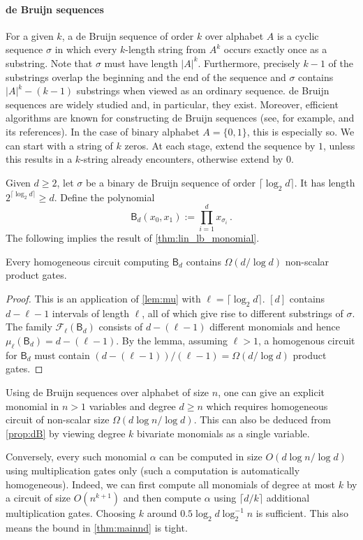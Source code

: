 \documentclass[11pt]{article}
\renewcommand{\fam}{\textbf{$\mathcal{F}$}}
\newcommand{\dB}{\mathsf{B}}
\begin{document}
\paragraph{de Bruijn sequences}
  For a given $k$, a de Bruijn sequence of order $k$ over alphabet $A$ is a cyclic sequence $\sigma$ in which every $k$-length string from $A^k$ occurs exactly once as a substring.  
  Note that $\sigma$ must have length $|A|^k$.
  Furthermore, precisely  $k-1$ of the substrings  overlap the beginning and the end of the sequence and $\sigma$ contains $|A|^k -(k-1)$ substrings when viewed as an ordinary sequence. 
  de Bruijn sequences  are widely studied and, in particular, they exist.
  Moreover, efficient algorithms are known for constructing de Bruijn sequences (see, for example, \cite{Sww16} and its references).  
  In the case of binary alphabet $A=\{0,1\}$, this is especially so.
  We can start with a string of $k$ zeros. At each stage, extend the sequence by $1$, unless this results in a $k$-string already encounters, otherwise extend by $0$.    

  Given $d\geq 2$, let $\sigma$ be a binary de Bruijn sequence of order $\lceil \log_2 d\rceil $. 
  It has length $2^{\lceil \log_2 d\rceil} \geq d$. Define the polynomial 
  \[ 
    \dB_d(x_0,x_1):= \prod_{i=1}^d x_{\sigma_i}\,.
  \]
  The following implies the result of \autoref{thm:lin_lb_monomial}.

\begin{proposition}\label{prop:dB} 
  Every homogeneous circuit computing $\dB_d$ contains $\Omega(d/\log d)$ non-scalar product gates. 
\end{proposition}

\begin{proof}  
  This is an application of \autoref{lem:mu} with $\ell=\lceil \log_2 d\rceil$. 
  $[d]$ contains $d-{\ell-1}$ intervals of length $\ell$, all of which give rise to different substrings of $\sigma$. 
  The family $\fam_\ell(\dB_d)$ consists of $d-(\ell-1)$ different monomials and hence $\mu_\ell(\dB_d)=d-(\ell-1)$. 
  By the lemma, assuming $\ell>1$, a homogenous circuit for $\dB_d$ must contain $(d-(\ell-1))/ (\ell-1)=\Omega(d/\log d)$ product gates.  
\end{proof}

\begin{remark} \label{rem:tight}
  Using de Bruijn sequences over alphabet of size $n$, one can give an explicit monomial in $n>1$ variables and degree $d\geq n$ which requires homogeneous circuit of non-scalar size $\Omega(d\log n/ \log d)$.  
  This can also be deduced from \autoref{prop:dB} by viewing degree $k$ bivariate monomials as a single variable. 

  Conversely, every such monomial $\alpha$ can be computed in size $O(d\log n/ \log d)$ using multiplication gates only (such a computation is automatically homogeneous). 
  Indeed, we can first compute all monomials of degree at most $k$ by a circuit of size $O(n^{k+1})$ and then compute $\alpha$ using $\lceil d/k\rceil$ additional multiplication gates. 
  Choosing $k$ around $0.5\log_2d\log^{-1}_2n$ is sufficient. This also means the bound in \autoref{thm:mainnd} is tight.
\end{remark}
\end{document}
